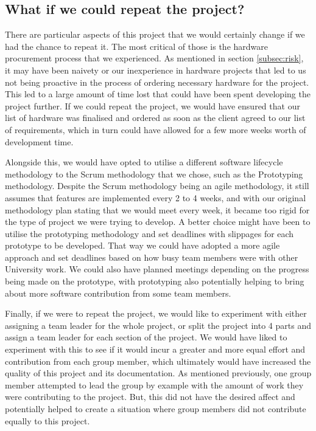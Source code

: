         \subsection{What if we could repeat the project?}

            There are particular aspects of this project that we would certainly change if we had the chance to repeat it. The most critical of those is the hardware procurement process that we experienced. As mentioned in section \ref{subsec:risk}, it may have been naivety or our inexperience in hardware projects that led to us not being proactive in the process of ordering necessary hardware for the project. This led to a large amount of time lost that could have been spent developing the project further. If we could repeat the project, we would have ensured that our list of hardware was finalised and ordered as soon as the client agreed to our list of requirements, which in turn could have allowed for a few more weeks worth of development time.

            Alongside this, we would have opted to utilise a different software lifecycle methodology to the Scrum methodology that we chose, such as the Prototyping methodology. Despite the Scrum methodology being an agile methodology, it still assumes that features are implemented every 2 to 4 weeks, and with our original methodology plan stating that we would meet every week, it became too rigid for the type of project we were trying to develop. A better choice might have been to utilise the prototyping methodology and set deadlines with slippages for each prototype to be developed. That way we could have adopted a more agile approach and set deadlines based on how busy team members were with other University work. We could also have planned meetings depending on the progress being made on the prototype, with prototyping also potentially helping to bring about more software contribution from some team members.

            Finally, if we were to repeat the project, we would like to experiment with either assigning a team leader for the whole project, or split the project into 4 parts and assign a team leader for each section of the project. We would have liked to experiment with this to see if it would incur a greater and more equal effort and contribution from each group member, which ultimately would have increased the quality of this project and its documentation. As mentioned previously, one group member attempted to lead the group by example with the amount of work they were contributing to the project. But, this did not have the desired affect and potentially helped to create a situation where group members did not contribute equally to this project.


